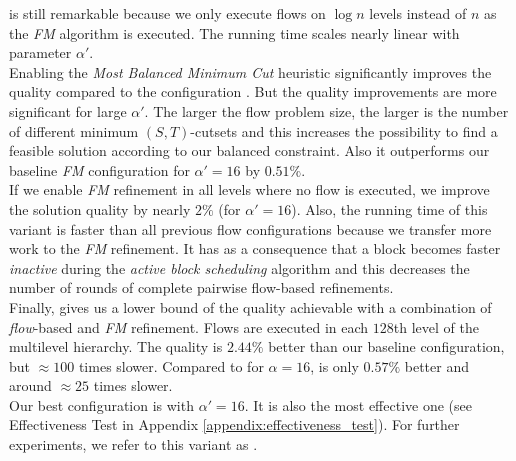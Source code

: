 is still remarkable because we only execute flows on $\log{n}$ levels
instead of $n$ as the \emph{FM} algorithm is executed. The running time
scales nearly linear with parameter $\alpha'$. \\
Enabling the \emph{Most Balanced Minimum Cut} heuristic significantly improves the
quality compared to the configuration \FlowVariant{+}{-}{-}.
But the quality improvements are more significant for large
$\alpha'$. The larger the flow problem size, the larger is the number of different minimum 
$(S,T)$-cutsets and this increases the possibility to find a feasible solution according to 
our balanced constraint. Also it outperforms our baseline \emph{FM} 
configuration for $\alpha' = 16$ by $0.51\%$.\\
If we enable \emph{FM} refinement in all levels where no flow is executed, we improve the solution
quality by nearly $2\%$ (for $\alpha' = 16$). Also, the running time of this variant is faster
than all previous flow configurations because we transfer more work to the \emph{FM} refinement.
It has as a consequence that a block becomes faster \emph{inactive} during the \emph{active block 
scheduling} algorithm and this decreases the number of rounds of complete pairwise 
flow-based refinements. \\
Finally,  gives us a lower bound of the quality
achievable with a combination of \emph{flow}-based and \emph{FM} refinement. Flows are executed 
in each $128$th level of the multilevel hierarchy. The quality is $2.44\%$ better than our
baseline configuration, but $\approx 100$ times slower. Compared to \FlowVariant{+}{+}{+} for 
$\alpha = 16$,  is only $0.57\%$ better and around $\approx 25$ times slower.\\
Our best configuration is \FlowVariant{+}{+}{+} with $\alpha' = 16$. It is also the most 
effective one (see Effectiveness Test in Appendix \ref{appendix:effectiveness_test}). For
further experiments, we refer to this variant as .

